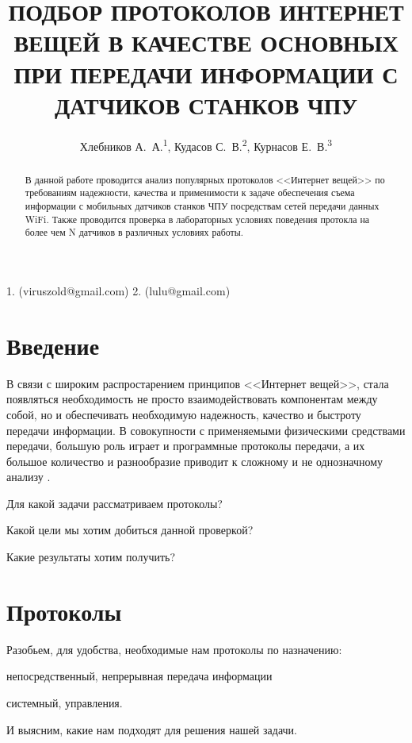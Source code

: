 \documentclass[russian]{article}
\begin{document}
\title{\textbf{ПОДБОР ПРОТОКОЛОВ ИНТЕРНЕТ ВЕЩЕЙ В КАЧЕСТВЕ ОСНОВНЫХ ПРИ ПЕРЕДАЧИ ИНФОРМАЦИИ С ДАТЧИКОВ СТАНКОВ ЧПУ}}

\author{Хлебников А.~А.\textsuperscript{1}, Кудасов С.~В.\textsuperscript{2}, Курнасов Е.~В.\textsuperscript{3}}

\maketitle
\thispagestyle{fancy}

1. (viruszold@gmail.com) 2. (lulu@gmail.com)
\begin{abstract}
В данной работе проводится анализ популярных протоколов <<Интернет вещей>> по требованиям 
надежности, качества и применимости к задаче обеспечения съема информации с мобильных датчиков станков
ЧПУ посредствам сетей передачи данных WiFi. Также проводится проверка в лабораторных условиях поведения протокла на более чем N датчиков в 
различных условиях работы.
\end{abstract}

\section*{Введение}

В связи с широким распростарением принципов <<Интернет вещей>>, стала появляться необходимость 
не просто взаимодействовать компонентам между собой, но и обеспечивать необходимую надежность, 
качество и быстроту передачи информации. В совокупности с применяемыми физическими средствами передачи, большую роль
играет и программные протоколы передачи, а их большое количество и разнообразие приводит к сложному и 
не однозначному анализу \cite{IoT_Protocols_Research}.

Для какой задачи рассматриваем протоколы?

Какой цели мы хотим добиться данной проверкой?

Какие результаты хотим получить?


\section*{Протоколы}

Разобьем, для удобства, необходимые нам протоколы по назначению:
\begin{enumerate*}[label={\alph*)},font={\color{red!50!black}\bfseries}]
\item непосредственный, непрерывная передача информации 
\item системный, управления.
 \end{enumerate*}
И выясним, какие нам подходят для решения нашей задачи.
 
\end{document}
